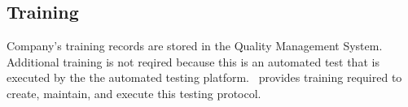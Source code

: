 \subsection{Training}
Company's training records are stored in the Quality Management System.
Additional training is not reqired because this is an automated test that is
executed by the the automated testing platform.  \sopSDLC\ provides training
required to create, maintain, and execute this testing protocol.
